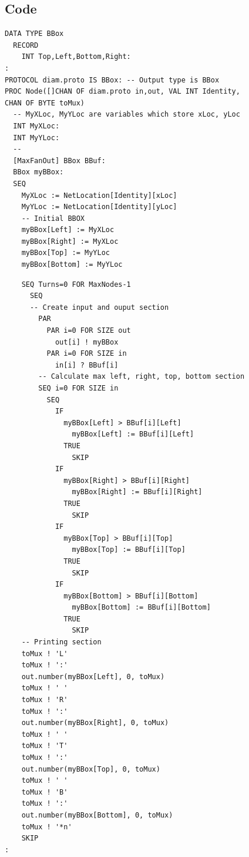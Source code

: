 \documentclass{article}
\begin{document}
\subsection{Code}
\begin{tcolorbox}
\begin{lstlisting}
DATA TYPE BBox
  RECORD
    INT Top,Left,Bottom,Right:
:
PROTOCOL diam.proto IS BBox: -- Output type is BBox 
PROC Node([]CHAN OF diam.proto in,out, VAL INT Identity,
CHAN OF BYTE toMux)
  -- MyXLoc, MyYLoc are variables which store xLoc, yLoc
  INT MyXLoc:
  INT MyYLoc:
  -- 
  [MaxFanOut] BBox BBuf:
  BBox myBBox:
  SEQ
    MyXLoc := NetLocation[Identity][xLoc]
    MyYLoc := NetLocation[Identity][yLoc]
    -- Initial BBOX
    myBBox[Left] := MyXLoc
    myBBox[Right] := MyXLoc
    myBBox[Top] := MyYLoc
    myBBox[Bottom] := MyYLoc
\end{lstlisting}
\end{tcolorbox}
\begin{tcolorbox}
\begin{lstlisting}
    SEQ Turns=0 FOR MaxNodes-1
      SEQ
      -- Create input and ouput section
        PAR
          PAR i=0 FOR SIZE out
            out[i] ! myBBox
          PAR i=0 FOR SIZE in
            in[i] ? BBuf[i]
        -- Calculate max left, right, top, bottom section
        SEQ i=0 FOR SIZE in
          SEQ
            IF
              myBBox[Left] > BBuf[i][Left]
                myBBox[Left] := BBuf[i][Left]
              TRUE
                SKIP
            IF
              myBBox[Right] > BBuf[i][Right]
                myBBox[Right] := BBuf[i][Right]
              TRUE
                SKIP
            IF
              myBBox[Top] > BBuf[i][Top]
                myBBox[Top] := BBuf[i][Top]
              TRUE
                SKIP
            IF
              myBBox[Bottom] > BBuf[i][Bottom]
                myBBox[Bottom] := BBuf[i][Bottom]
              TRUE
                SKIP
    -- Printing section
    toMux ! 'L'
    toMux ! ':'
    out.number(myBBox[Left], 0, toMux)
    toMux ! ' '
    toMux ! 'R'
    toMux ! ':'
    out.number(myBBox[Right], 0, toMux)
    toMux ! ' '
    toMux ! 'T'
    toMux ! ':'
    out.number(myBBox[Top], 0, toMux)
    toMux ! ' '
    toMux ! 'B'
    toMux ! ':'
    out.number(myBBox[Bottom], 0, toMux)
    toMux ! '*n'
    SKIP
:
\end{lstlisting}
\end{tcolorbox}
\newpage
\end{document}
